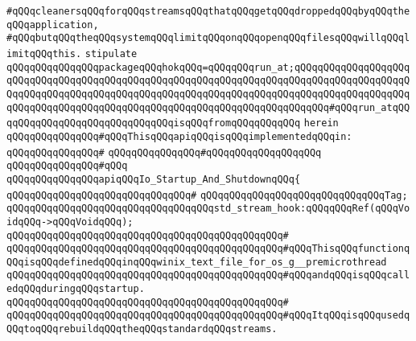 \verb|#qQQqcleanersqQQqforqQQqstreamsqQQqthatqQQqgetqQQqdroppedqQQqbyqQQqtheqQQqapplication,|\newline
\verb|#qQQqbutqQQqtheqQQqsystemqQQqlimitqQQqonqQQqopenqQQqfilesqQQqwillqQQqlimitqQQqthis.|\newline
\newline
\newline
\verb|stipulate|\newline
\verb|qQQqqQQqqQQqqQQqpackageqQQqhokqQQq=qQQqqQQqrun_at;qQQqqQQqqQQqqQQqqQQqqQQqqQQqqQQqqQQqqQQqqQQqqQQqqQQqqQQqqQQqqQQqqQQqqQQqqQQqqQQqqQQqqQQqqQQqqQQqqQQqqQQqqQQqqQQqqQQqqQQqqQQqqQQqqQQqqQQqqQQqqQQqqQQqqQQqqQQqqQQqqQQqqQQqqQQqqQQqqQQqqQQqqQQqqQQqqQQqqQQqqQQqqQQqqQQqqQQq#qQQqrun_atqQQqqQQqqQQqqQQqqQQqqQQqqQQqqQQqisqQQqfromqQQqqQQqqQQq|\newline
\verb|herein|\newline
\newline
\verb|qQQqqQQqqQQqqQQq#qQQqThisqQQqapiqQQqisqQQqimplementedqQQqin:|\newline
\verb|qQQqqQQqqQQqqQQq#|\newline
\verb|qQQqqQQqqQQqqQQq#qQQqqQQqqQQqqQQqqQQq|\newline
\verb|qQQqqQQqqQQqqQQq#qQQq|\newline
\verb|qQQqqQQqqQQqqQQqapiqQQqIo_Startup_And_ShutdownqQQq{|\newline
\verb|qQQqqQQqqQQqqQQqqQQqqQQqqQQqqQQq#|\newline
\verb|qQQqqQQqqQQqqQQqqQQqqQQqqQQqqQQqTag;|\newline
\newline
\verb|qQQqqQQqqQQqqQQqqQQqqQQqqQQqqQQqqQQqstd_stream_hook:qQQqqQQqRef(qQQqVoidqQQq->qQQqVoidqQQq);|\newline
\verb|qQQqqQQqqQQqqQQqqQQqqQQqqQQqqQQqqQQqqQQqqQQqqQQq#|\newline
\verb|qQQqqQQqqQQqqQQqqQQqqQQqqQQqqQQqqQQqqQQqqQQqqQQq#qQQqThisqQQqfunctionqQQqisqQQqdefinedqQQqinqQQqwinix_text_file_for_os_g__premicrothread|\newline
\verb|qQQqqQQqqQQqqQQqqQQqqQQqqQQqqQQqqQQqqQQqqQQqqQQq#qQQqandqQQqisqQQqcalledqQQqduringqQQqstartup.|\newline
\verb|qQQqqQQqqQQqqQQqqQQqqQQqqQQqqQQqqQQqqQQqqQQqqQQq#|\newline
\verb|qQQqqQQqqQQqqQQqqQQqqQQqqQQqqQQqqQQqqQQqqQQqqQQq#qQQqItqQQqisqQQqusedqQQqtoqQQqrebuildqQQqtheqQQqstandardqQQqstreams.|\newline
